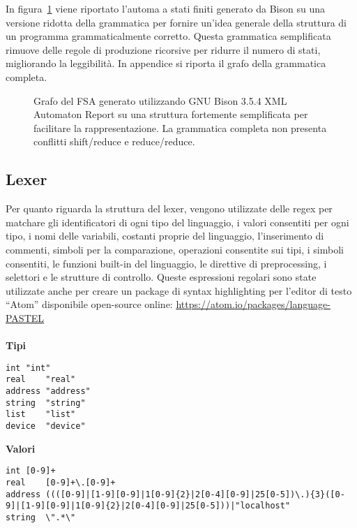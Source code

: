\documentclass[10pt]{article}
\begin{document}
In figura~\ref{fig:parser_simple} viene riportato l'automa a stati finiti generato da Bison su una versione ridotta della grammatica per fornire un'idea generale della struttura di un programma grammaticalmente corretto. Questa grammatica semplificata rimuove delle regole di produzione ricorsive per ridurre il numero di stati, migliorando la leggibilità. In appendice si riporta il grafo della grammatica completa.\\

\begin{figure}
	\centering
	\caption{Grafo del FSA generato utilizzando  GNU Bison 3.5.4 XML Automaton Report su una struttura fortemente semplificata per facilitare la rappresentazione. La grammatica completa non presenta conflitti shift/reduce e reduce/reduce.}
	\label{fig:parser_simple}
\end{figure}

\subsection{Lexer}

Per quanto riguarda la struttura del lexer, vengono utilizzate delle regex per matchare gli identificatori di ogni tipo del linguaggio, i valori consentiti per ogni tipo, i nomi delle variabili, costanti proprie del linguaggio, l'inserimento di commenti, simboli per la comparazione, operazioni consentite sui tipi, i simboli consentiti, le funzioni built-in del linguaggio, le direttive di preprocessing, i selettori e le strutture di controllo. Queste espressioni regolari sono state utilizzate anche per creare un package di syntax highlighting per l'editor di testo ``Atom'' disponibile open-source online: \textcolor{blue}{\underline{\url{https://atom.io/packages/language-PASTEL}}}\\\\

\textbf{Tipi}
\begin{lstlisting}[breaklines=true, postbreak=\mbox{{$\hookrightarrow$}\space}]
int	"int"
real	"real"
address	"address"
string	"string"
list	"list"
device	"device"
\end{lstlisting}

\textbf{Valori}
\begin{lstlisting}[breaklines=true, postbreak=\mbox{{$\hookrightarrow$}\space}]
int	[0-9]+
real	[0-9]+\.[0-9]+
address	((([0-9]|[1-9][0-9]|1[0-9]{2}|2[0-4][0-9]|25[0-5])\.){3}([0-9]|[1-9][0-9]|1[0-9]{2}|2[0-4][0-9]|25[0-5]))|"localhost"
string	\".*\"
\end{lstlisting}
\end{document}
